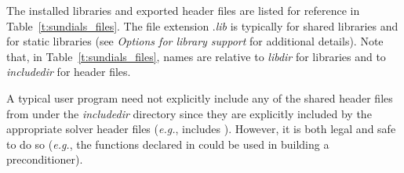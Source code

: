 The installed libraries and exported header files are listed for
reference in Table~\ref{t:sundials_files}.  The file extension .{\em lib}
is typically  for shared libraries and  for static libraries
(see {\em Options for library support} for additional details).
Note that, in Table~\ref{t:sundials_files}, names are relative to {\em libdir}
for libraries and to {\em includedir} for header files.

A typical user program need not explicitly include any of the shared
{\sundials} header files from under the {\em includedir}
directory since they are explicitly included by the appropriate solver
header files ({\em e.g.},  includes
). However, it is both legal and safe to do so
({\em e.g.}, the functions declared in  
could be used in building a preconditioner).

